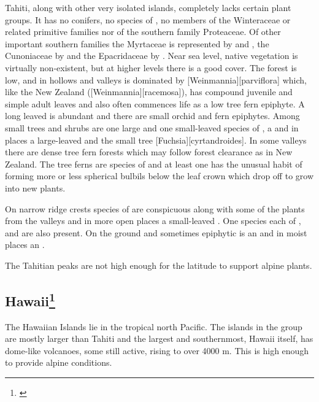 Tahiti, along with other very isolated islands, completely lacks certain plant groups.
It has no conifers, no species of , no members of the Winteraceae or related primitive families nor of the southern family Proteaceae.
Of other important southern families the Myrtaceae is represented by  and , the Cunoniaceae by  and the Epacridaceae by .
Near sea level, native vegetation is virtually non-existent, but at higher levels there is a good cover.
The forest is low, and in hollows and valleys is dominated by [Weinmannia][parviflora] which, like the New Zealand  ([Weinmannia][racemosa]), has compound juvenile and simple adult leaves and also often commences life as a low tree fern epiphyte.
A long leaved  is abundant and there are small orchid and fern epiphytes.
Among small trees and shrubs are one large and one small-leaved species of , a  and in places a large-leaved  and the small tree [Fuchsia][cyrtandroides].
In some valleys there are dense tree fern forests which may follow forest clearance as in New Zealand.
The tree ferns are species of  and at least one has the unusual habit of forming more or less spherical bulbils below the leaf crown which drop off to grow into new plants.

On narrow ridge crests species of  are conspicuous along with some of the plants from the valleys and in more open places a small-leaved .
One species each of ,  and  are also present.
On the ground and sometimes epiphytic is an  and in moist places an .

The Tahitian peaks are not high enough for the latitude to support alpine plants.

\subsection[Hawai{\okina}i]{Hawai{\okina}i\thinspace\footnote{\cite{carlquist1970hawaii}}}

The Hawaiian Islands lie in the tropical north Pacific.
The islands in the group are mostly larger than Tahiti and the largest and southernmost, Hawai{\okina}i itself, has dome-like volcanoes, some still active, rising to over 4000 m.
This is high enough to provide alpine conditions.

